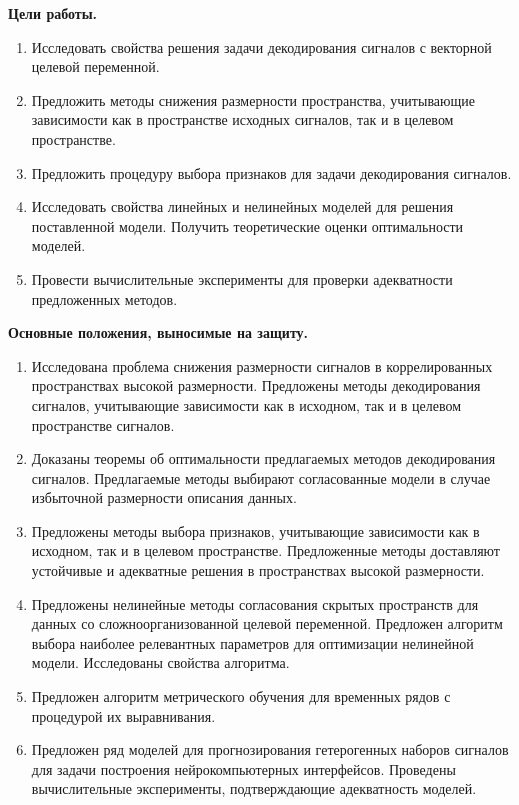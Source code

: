 \vspace{0.5cm}
\textbf{Цели работы.}
\begin{enumerate}
	\item Исследовать свойства решения задачи декодирования сигналов с векторной целевой переменной.
	\item Предложить методы снижения размерности пространства, учитывающие зависимости как в пространстве исходных сигналов, так и в целевом пространстве.
	\item Предложить процедуру выбора признаков для задачи декодирования сигналов.
	\item Исследовать свойства линейных и нелинейных моделей для решения поставленной модели. Получить теоретические оценки оптимальности моделей.
	\item Провести вычислительные эксперименты для проверки адекватности предложенных методов.
\end{enumerate}


\vspace{0.5cm}
\textbf{Основные положения, выносимые на защиту.}
\begin{enumerate}
	\item Исследована проблема снижения размерности сигналов в коррелированных пространствах высокой размерности. Предложены методы декодирования сигналов, учитывающие зависимости как в исходном, так и в целевом пространстве сигналов.
	\item Доказаны теоремы об оптимальности предлагаемых методов декодирования сигналов. Предлагаемые методы выбирают согласованные модели в случае избыточной размерности описания данных.
	\item Предложены методы выбора признаков, учитывающие зависимости как в исходном, так и в целевом пространстве. Предложенные методы доставляют устойчивые и адекватные решения в пространствах высокой размерности. 
	\item Предложены нелинейные методы согласования скрытых пространств для данных со сложноорганизованной целевой переменной. Предложен алгоритм выбора наиболее релевантных параметров для оптимизации нелинейной модели. Исследованы свойства алгоритма.
	\item Предложен алгоритм метрического обучения для временных рядов с процедурой их выравнивания.
	\item Предложен ряд моделей для прогнозирования гетерогенных наборов сигналов для задачи построения нейрокомпьютерных интерфейсов. Проведены вычислительные эксперименты, подтверждающие адекватность моделей.
\end{enumerate}

